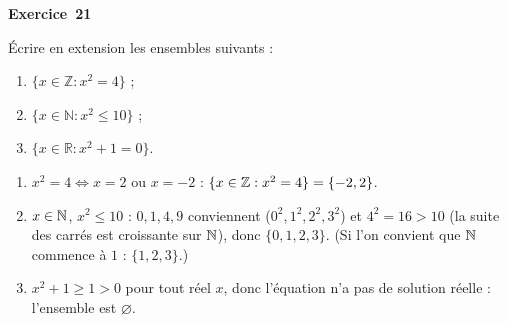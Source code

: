 \documentclass[11pt,a4paper]{article}
\begin{document}
	\medskip\noindent\textbf{\Large\color{bleu}Exercice~21}\nopagebreak
	\begin{enonce}
		Écrire en extension les ensembles suivants :
		\begin{enumerate}
			\item $\{x\in\mathbb{Z}:x^2=4\}$ ;
			\item $\{x\in\mathbb{N}:x^2\leq 10\}$ ;
			\item $\{x\in\mathbb{R}:x^2+1=0\}$.
		\end{enumerate}
	\end{enonce}
	\begin{corrige}
		\begin{enumerate}
			\item $x^2=4\iff x=2$ ou $x=-2$ : $\{x\in\mathbb{Z}:x^2=4\}=\{-2,2\}$.
			\item $x\in\mathbb{N}$, $x^2\leq10$ : $0,1,4,9$ conviennent ($0^2,1^2,2^2,3^2$) et $4^2=16>10$ (la suite des carrés est croissante sur $\mathbb{N}$), donc $\{0,1,2,3\}$. (Si l'on convient que $\mathbb{N}$ commence à $1$ : $\{1,2,3\}$.)
			\item $x^2+1\geq1>0$ pour tout réel $x$, donc l'équation n'a pas de solution réelle : l'ensemble est $\varnothing$.
		\end{enumerate}
	\end{corrige}
	
\end{document}

